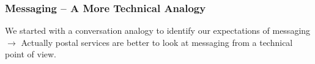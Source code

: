 \documentclass[
	aspectratio=169,
	xetex,
]{beamer}
\newcounter{i}
\begin{document}
\begin{frame}
	\frametitle{Messaging -- A More Technical Analogy}
		We started with a conversation analogy to identify our expectations of messaging\\[12pt]
		$\rightarrow$ Actually \alert{postal services} are better to look at messaging from a technical point of view.\\[24pt]
		\begin{center}
		\end{center}
\end{frame}
\end{document}
